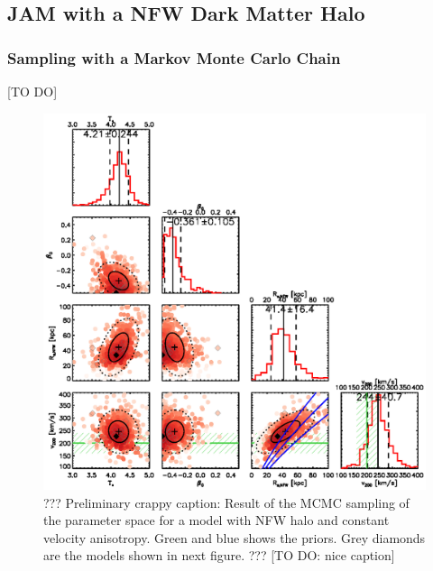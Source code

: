 \subsection{JAM with a NFW Dark Matter Halo}

\subsubsection{Sampling with a Markov Monte Carlo Chain}

[TO DO]

\begin{figure}
\centering
\includegraphics[width=0.9\linewidth]{fig/B4_contour_plot_short.ps}
\caption{??? Preliminary crappy caption: Result of the MCMC sampling of the parameter space for a model with NFW halo and constant velocity anisotropy. Green and blue shows the priors. Grey diamonds are the models shown in next figure. ??? [TO DO: nice caption]}
\label{fig:???}
\end{figure}

